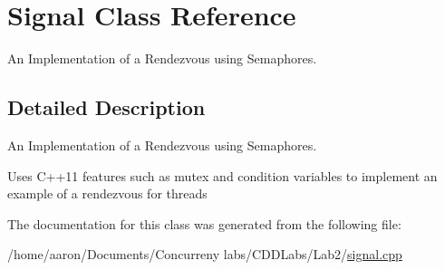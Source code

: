 \hypertarget{class_signal}{}\section{Signal Class Reference}
\label{class_signal}


An Implementation of a Rendezvous using Semaphores.  




\subsection{Detailed Description}
An Implementation of a Rendezvous using Semaphores. 

Uses C++11 features such as mutex and condition variables to implement an example of a rendezvous for threads 

The documentation for this class was generated from the following file\+:\begin{DoxyCompactItemize}
\item 
/home/aaron/\+Documents/\+Concurreny labs/\+C\+D\+D\+Labs/\+Lab2/\hyperlink{signal_8cpp}{signal.\+cpp}\end{DoxyCompactItemize}
